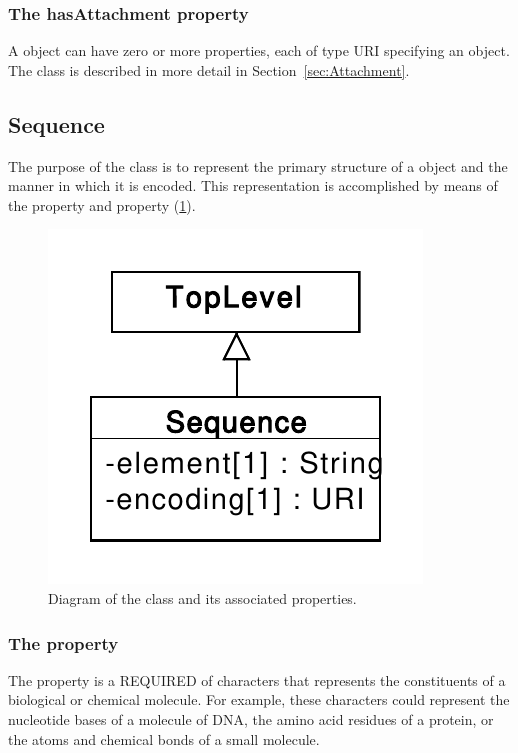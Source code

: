 \subsubsection*{The hasAttachment property}
\label{sec:hasAttachment}
A  object can have zero or more  properties, each of type URI specifying an  object. The  class is described in more detail in Section~\ref{sec:Attachment}.

\subsection{Sequence}
\label{sec:Sequence}
The purpose of the  class is to represent the primary structure of a  object and the manner in which it is encoded. This representation is accomplished  by means of the  property and  property (\ref{uml:sequence}).

\begin{figure}[ht]
\begin{center}
\includegraphics[scale=0.6]{uml/sequence}
\caption[]{Diagram of the  class and its associated properties.}
\label{uml:sequence}
\end{center}
\end{figure}


\subsubsection*{The  property}
\label{sec:elements}
The  property is a REQUIRED  of characters that represents the constituents of a biological or chemical molecule. For example, these characters could represent the nucleotide bases of a molecule of DNA, the amino acid residues of a protein, or the atoms and chemical bonds of a small molecule.

